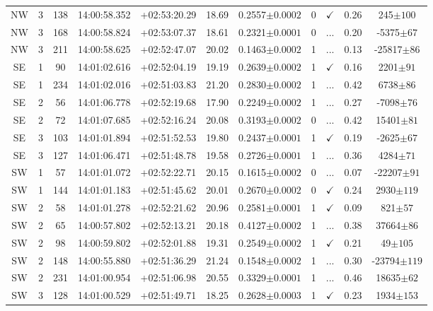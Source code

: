 \begin{landscape}
\begin{longtable}{ccccccccccc}
	NW & 3 & 138 & 14:00:58.352 & +02:53:20.29 & 18.69 & 0.2557$\pm{0.0002}$ & 0 & $\checkmark$ & 0.26 & 245$\pm{100}$ \\
	NW & 3 & 168 & 14:00:58.824 & +02:53:07.37 & 18.61 & 0.2321$\pm{0.0001}$ & 0 & ... & 0.20 & -5375$\pm{67}$ \\
	NW & 3 & 211 & 14:00:58.625 & +02:52:47.07 & 20.02 & 0.1463$\pm{0.0002}$ & 1 & ... & 0.13 & -25817$\pm{86}$ \\
	SE & 1 & 90 & 14:01:02.616 & +02:52:04.19 & 19.19 & 0.2639$\pm{0.0002}$ & 1 & $\checkmark$ & 0.16 & 2201$\pm{91}$ \\
	SE & 1 & 234 & 14:01:02.016 & +02:51:03.83 & 21.20 & 0.2830$\pm{0.0002}$ & 1 & ... & 0.42 & 6738$\pm{86}$ \\
	SE & 2 & 56 & 14:01:06.778 & +02:52:19.68 & 17.90 & 0.2249$\pm{0.0002}$ & 1 & ... & 0.27 & -7098$\pm{76}$ \\
	SE & 2 & 72 & 14:01:07.685 & +02:52:16.24 & 20.08 & 0.3193$\pm{0.0002}$ & 0 & ... & 0.42 & 15401$\pm{81}$ \\
	SE & 3 & 103 & 14:01:01.894 & +02:51:52.53 & 19.80 & 0.2437$\pm{0.0001}$ & 1 & $\checkmark$ & 0.19 & -2625$\pm{67}$ \\
	SE & 3 & 127 & 14:01:06.471 & +02:51:48.78 & 19.58 & 0.2726$\pm{0.0001}$ & 1 & ... & 0.36 & 4284$\pm{71}$ \\
	SW & 1 & 57 & 14:01:01.072 & +02:52:22.71 & 20.15 & 0.1615$\pm{0.0002}$ & 0 & ... & 0.07 & -22207$\pm{91}$ \\
	SW & 1 & 144 & 14:01:01.183 & +02:51:45.62 & 20.01 & 0.2670$\pm{0.0002}$ & 0 & $\checkmark$ & 0.24 & 2930$\pm{119}$ \\
	SW & 2 & 58 & 14:01:01.278 & +02:52:21.62 & 20.96 & 0.2581$\pm{0.0001}$ & 1 & $\checkmark$ & 0.09 & 821$\pm{57}$ \\
	SW & 2 & 65 & 14:00:57.802 & +02:52:13.21 & 20.18 & 0.4127$\pm{0.0002}$ & 1 & ... & 0.38 & 37664$\pm{86}$ \\
	SW & 2 & 98 & 14:00:59.802 & +02:52:01.88 & 19.31 & 0.2549$\pm{0.0002}$ & 1 & $\checkmark$ & 0.21 & 49$\pm{105}$ \\
	SW & 2 & 148 & 14:00:55.880 & +02:51:36.29 & 21.24 & 0.1548$\pm{0.0002}$ & 1 & ... & 0.30 & -23794$\pm{119}$ \\
	SW & 2 & 231 & 14:01:00.954 & +02:51:06.98 & 20.55 & 0.3329$\pm{0.0001}$ & 1 & ... & 0.46 & 18635$\pm{62}$ \\
	SW & 3 & 128 & 14:01:00.529 & +02:51:49.71 & 18.25 & 0.2628$\pm{0.0003}$ & 1 & $\checkmark$ & 0.23 & 1934$\pm{153}$ \\

\end{longtable}
\end{landscape}
